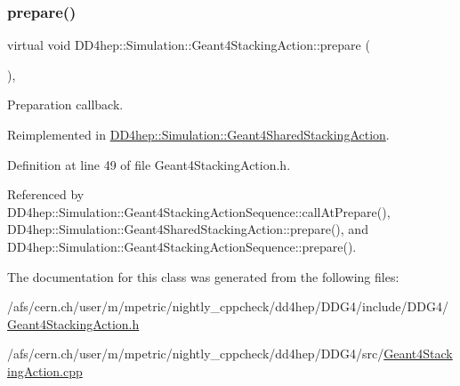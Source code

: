 \subsubsection{\texorpdfstring{prepare()}{prepare()}}
{\footnotesize\ttfamily virtual void D\+D4hep\+::\+Simulation\+::\+Geant4\+Stacking\+Action\+::prepare (\begin{DoxyParamCaption}{ }\end{DoxyParamCaption})\hspace{0.3cm}{\ttfamily [inline]}, {\ttfamily [virtual]}}



Preparation callback. 



Reimplemented in \hyperlink{class_d_d4hep_1_1_simulation_1_1_geant4_shared_stacking_action_a22e3516dfed160da7a3b246d28098891}{D\+D4hep\+::\+Simulation\+::\+Geant4\+Shared\+Stacking\+Action}.



Definition at line 49 of file Geant4\+Stacking\+Action.\+h.



Referenced by D\+D4hep\+::\+Simulation\+::\+Geant4\+Stacking\+Action\+Sequence\+::call\+At\+Prepare(), D\+D4hep\+::\+Simulation\+::\+Geant4\+Shared\+Stacking\+Action\+::prepare(), and D\+D4hep\+::\+Simulation\+::\+Geant4\+Stacking\+Action\+Sequence\+::prepare().



The documentation for this class was generated from the following files\+:\begin{DoxyCompactItemize}
\item 
/afs/cern.\+ch/user/m/mpetric/nightly\+\_\+cppcheck/dd4hep/\+D\+D\+G4/include/\+D\+D\+G4/\hyperlink{_geant4_stacking_action_8h}{Geant4\+Stacking\+Action.\+h}\item 
/afs/cern.\+ch/user/m/mpetric/nightly\+\_\+cppcheck/dd4hep/\+D\+D\+G4/src/\hyperlink{_geant4_stacking_action_8cpp}{Geant4\+Stacking\+Action.\+cpp}\end{DoxyCompactItemize}
